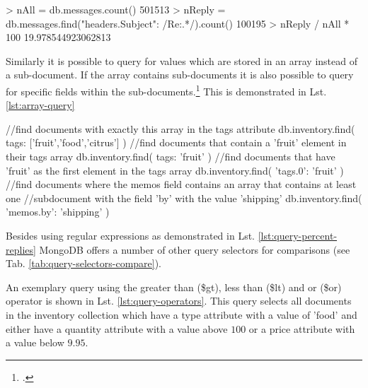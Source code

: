 \begin{listing}
    \begin{javascriptcode}
> nAll = db.messages.count()
501513
> nReply = db.messages.find({"headers.Subject": /Re:.*/}).count()
100195
> nReply / nAll * 100
19.978544923062813
    \end{javascriptcode}
    \caption[Calculating the percentage of replies]{Calculating the percentage of replies in the messages collection within the mongo shell}
    \label{lst:query-percent-replies}
\end{listing}

Similarly it is possible to query for values which are stored in an array
instead of a sub-document.
If the array contains sub-documents it is also possible to query for specific
fields within the sub-documents.\footcite[Cf.][10]{mongo_crud_manual} This is
demonstrated in Lst. \ref{lst:array-query}

\begin{listing}
    \begin{javascriptcode}
//find documents with exactly this array in the tags attribute
db.inventory.find( { tags: ['fruit','food','citrus'] } )
//find documents that contain a 'fruit' element in their tags array
db.inventory.find( { tags: 'fruit'} )
//find documents that have 'fruit' as the first element in the tags array
db.inventory.find( {'tags.0': 'fruit'} )
//find documents where the memos field contains an array that contains at least one
//subdocument with the field 'by' with the value 'shipping'
db.inventory.find( {'memos.by': 'shipping'} )
    \end{javascriptcode}
    \caption{Array queries on an inventory collection}
    \label{lst:array-query}
\end{listing}

Besides using regular expressions as demonstrated in Lst. \ref{lst:query-percent-replies} MongoDB
offers a number of other query selectors for comparisons (see Tab. \ref{tab:query-selectors-compare}).

An exemplary query using the greater than (\$gt), less than (\$lt) and or (\$or)
operator is shown in Lst. \ref{lst:query-operators}.
This query selects all documents in the inventory collection which have a type attribute with
a value of 'food' and either have  a quantity attribute with a value above $100$ or a price attribute
with a value below $9.95$.

\begin{listing}
    \caption[Exemplary usage of query operators]{Exemplary usage of query operators\footcite[][9]{mongo_crud_manual}}
    \label{lst:query-operators}
\end{listing}


